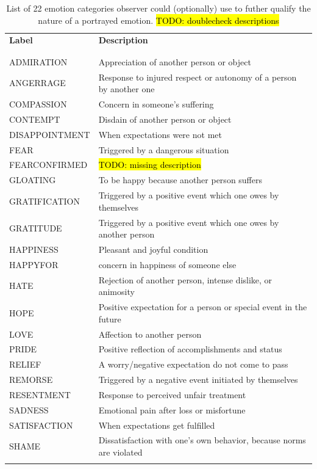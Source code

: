 \documentclass[10pt,a4paper,twocolumn]{article}
\begin{document}
\begin{table}
  \centering
  \begin{tabular}{lp{10cm}}
    \textbf{Label} & \textbf{Description} \\
    \\\hline\\
    ADMIRATION & Appreciation of another person or object \\
    ANGERRAGE & Response to injured respect or autonomy of a person by another one \\
    COMPASSION & Concern in someone's suffering \\
    CONTEMPT & Disdain of another person or object \\
    DISAPPOINTMENT & When expectations were not met \\
    FEAR & Triggered by a dangerous situation \\
    FEARCONFIRMED & \hl{TODO: missing description}\\
    GLOATING & To be happy because another person suffers \\
    GRATIFICATION & Triggered by a positive event which one owes by themselves  \\
    GRATITUDE & Triggered by a positive event which one owes by another person \\
    HAPPINESS & Pleasant and joyful condition \\
    HAPPYFOR & concern in happiness of someone else \\
    HATE & Rejection of another person, intense dislike, or animosity \\
    HOPE & Positive expectation for a person or special event in the future \\
    LOVE & Affection to another person \\
    PRIDE & Positive reflection of accomplishments and status \\
    RELIEF & A worry/negative expectation do not come to pass \\
    REMORSE & Triggered by a negative event initiated by themselves \\
    RESENTMENT & Response to perceived unfair treatment \\
    SADNESS & Emotional pain after loss or misfortune \\
    SATISFACTION & When expectations get fulfilled \\
    SHAME & Dissatisfaction with one's own behavior, because norms are violated \\
    \\\hline
  \end{tabular}
  \caption{List of 22 emotion categories observer could (optionally) use to
    futher qualify the nature of a portrayed emotion. \hl{TODO: doublecheck descriptions}}
  \label{tab:emotion_categories}
\end{table}
\end{document}
